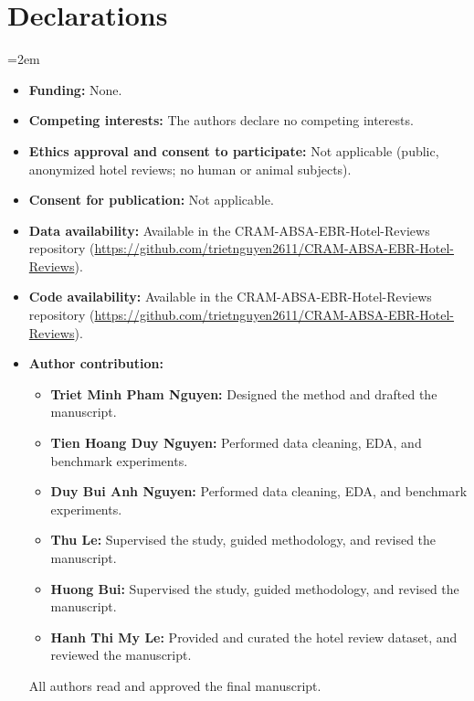 \documentclass{llncs}
\begin{document}
\section*{Declarations}
\begingroup\small{}\emergencystretch=2em
\begin{itemize}[topsep=1pt, itemsep=1pt, parsep=0pt]
\item \textbf{Funding:} None.
\item \textbf{Competing interests:} The authors declare no competing interests.
\item \textbf{Ethics approval and consent to participate:} Not applicable (public, anonymized hotel reviews; no human or animal subjects).
\item \textbf{Consent for publication:} Not applicable.
\item \textbf{Data availability:} Available in the CRAM-ABSA-EBR-Hotel-Reviews repository (\url{https://github.com/trietnguyen2611/CRAM-ABSA-EBR-Hotel-Reviews}).
\item \textbf{Code availability:} Available in the CRAM-ABSA-EBR-Hotel-Reviews repository (\url{https://github.com/trietnguyen2611/CRAM-ABSA-EBR-Hotel-Reviews}).
\item \textbf{Author contribution:}
\begin{itemize}[leftmargin=1.2em, nolistsep]
\item \textbf{Triet Minh Pham Nguyen:} Designed the method and drafted the manuscript.
\item \textbf{Tien Hoang Duy Nguyen:} Performed data cleaning, EDA, and benchmark experiments.
\item \textbf{Duy Bui Anh Nguyen:} Performed data cleaning, EDA, and benchmark experiments.
\item \textbf{Thu Le:} Supervised the study, guided methodology, and revised the manuscript.
\item \textbf{Huong Bui:} Supervised the study, guided methodology, and revised the manuscript.
\item \textbf{Hanh Thi My Le:} Provided and curated the hotel review dataset, and reviewed the manuscript.
\end{itemize}
\noindent All authors read and approved the final manuscript.
\end{itemize}
\endgroup

\clearpage
\begingroup
\let\oldthebibliography\thebibliography
\renewcommand{\thebibliography}[1]{\oldthebibliography{#1}\setlength{\itemsep}{1.5pt}}


\endgroup
\end{document}

